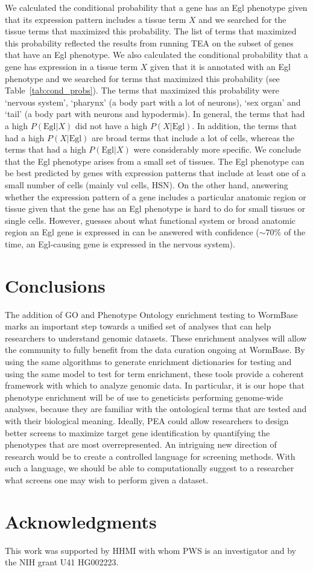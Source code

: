 \documentclass[10pt, onecolumn]{article}
\begin{document}
We calculated the conditional probability that a gene has an Egl phenotype given
that its expression pattern includes a tissue term $X$ and we searched for the
tissue terms that maximized this probability. The list of terms that maximized
this probability reflected the results from running TEA on the subset of genes
that have an Egl phenotype. We also calculated the conditional probability that
a gene has expression in a tissue term $X$ given that it is annotated with an
Egl phenotype and we searched for terms that maximized this probability (see
Table~\ref{tab:cond_probs}). The terms that maximized this probability were
`nervous system', `pharynx' (a body part with a lot of neurons), `sex organ' and
`tail' (a body part with neurons and hypodermis). In general, the terms that had
a high $P(\text{Egl}|X)$ did not have a high $P(X|\text{Egl})$. In addition,
the terms that had a high $P(X|\text{Egl})$ are broad terms that include a lot
of cells, whereas the terms that had a high $P(\text{Egl}|X)$ were considerably
more specific. We conclude that the Egl phenotype arises from a small set of
tissues. The Egl phenotype can be best predicted by genes with expression
patterns that include at least one of a small number of cells (mainly vul cells,
HSN). On the other hand, answering whether the expression pattern of a gene
includes a particular anatomic region or tissue given that the gene has an Egl
phenotype is hard to do for small tissues or single cells. However, guesses
about what functional system or broad anatomic region an Egl gene is expressed
in can be answered with confidence ($\sim70\%$ of the time, an Egl-causing gene
is expressed in the nervous system).

\section*{Conclusions}
The addition of GO and Phenotype Ontology enrichment testing to WormBase marks
an important step towards a unified set of analyses that can help researchers to
understand genomic datasets. These enrichment analyses will allow the community
to fully benefit from the data curation ongoing at WormBase. By using the same
algorithms to generate enrichment dictionaries for testing and using the same
model to test for term enrichment, these tools provide a coherent framework with
which to analyze genomic data. In particular, it is our hope that phenotype
enrichment will be of use to geneticists performing genome-wide analyses,
because they are familiar with the ontological terms that are tested and with
their biological meaning. Ideally, PEA could allow researchers to design better
screens to maximize target gene identification by quantifying the phenotypes
that are most overrepresented. An intriguing new direction of research would be
to create a controlled language for screening methods. With such a language, we
should be able to computationally suggest to a researcher what screens one may
wish to perform given a dataset.

\section*{Acknowledgments}
This work was supported by HHMI with whom PWS is an investigator and by
the NIH grant U41 HG002223.



\end{document}
